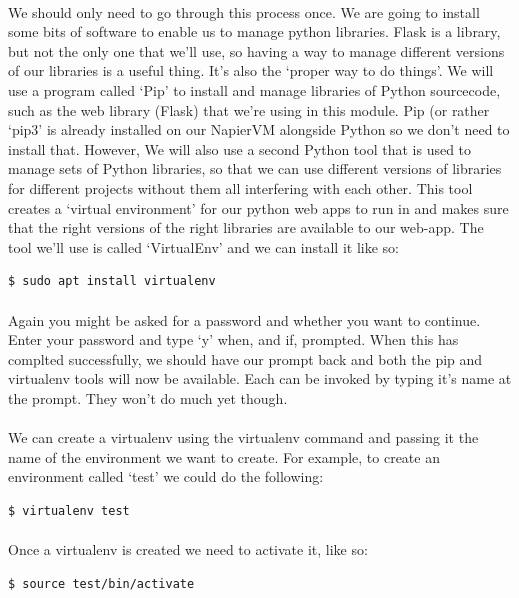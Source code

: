 \documentclass[12pt, a4paper, oneside]{book}
\begin{document}
\paragraph{} We should only need to go through this process once. We are going to install some bits of software to enable us to manage python libraries. Flask is a library, but not the only one that we'll use, so having a way to manage different versions of our libraries is a useful thing. It's also the `proper way to do things'. We will use a program called `Pip' to install and manage libraries of Python sourcecode, such as the web library (Flask) that we're using in this module. Pip (or rather `pip3' is already installed on our NapierVM alongside Python so we don't need to install that. However, We will also use a second Python tool that is used to manage sets of Python libraries, so that we can use different versions of libraries for different projects without them all interfering with each other. This tool creates a `virtual environment' for our python web apps to run in and makes sure that the right versions of the right libraries are available to our web-app. The tool we'll use is called `VirtualEnv' and we can install it like so:

\begin{lstlisting}[style=DOS]
    $ sudo apt install virtualenv
\end{lstlisting}

\paragraph{} Again you might be asked for a password and whether you want to continue. Enter your password and type `y' when, and if, prompted. When this has complted successfully, we should have our prompt back and both the pip and virtualenv tools will now be available. Each can be invoked by typing it's name at the prompt. They won't do much yet though. 

\paragraph{} We can create a virtualenv using the virtualenv command and passing it the name of the environment we want to create. For example, to create an environment called `test' we could do the following:
\begin{lstlisting}[style=DOS]
    $ virtualenv test
\end{lstlisting}

\paragraph{} Once a virtualenv is created we need to activate it, like so:
\begin{lstlisting}[style=DOS]
    $ source test/bin/activate
\end{lstlisting}
\end{document}
